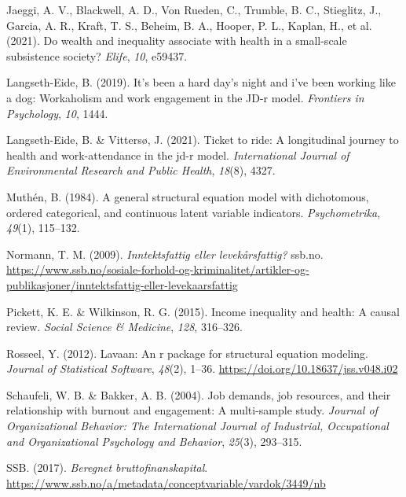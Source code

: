 \documentclass[
  12pt,
  a4paper,
  DIV=11,
  numbers=noendperiod]{scrartcl}
\newlength{\cslhangindent}
\newenvironment{CSLReferences}[2] %
 {\begin{list}{}{%
  \setlength{\itemindent}{0pt}
  \setlength{\leftmargin}{0pt}
  \setlength{\parsep}{0pt}
  \ifodd #1
   \setlength{\leftmargin}{\cslhangindent}
   \setlength{\itemindent}{-1\cslhangindent}
  \fi
  \setlength{\itemsep}{#2\baselineskip}}}
 {\end{list}}
\begin{document}
\begin{CSLReferences}{1}{0}
Jaeggi, A. V., Blackwell, A. D., Von Rueden, C., Trumble, B. C.,
Stieglitz, J., Garcia, A. R., Kraft, T. S., Beheim, B. A., Hooper, P.
L., Kaplan, H., et al. (2021). Do wealth and inequality associate with
health in a small-scale subsistence society? \emph{Elife}, \emph{10},
e59437.

Langseth-Eide, B. (2019). It's been a hard day's night and i've been
working like a dog: Workaholism and work engagement in the JD-r model.
\emph{Frontiers in Psychology}, \emph{10}, 1444.

Langseth-Eide, B. \& Vittersø, J. (2021). Ticket to ride: A longitudinal
journey to health and work-attendance in the jd-r model.
\emph{International Journal of Environmental Research and Public
Health}, \emph{18}(8), 4327.

Muthén, B. (1984). A general structural equation model with dichotomous,
ordered categorical, and continuous latent variable indicators.
\emph{Psychometrika}, \emph{49}(1), 115--132.

Normann, T. M. (2009). \emph{Inntektsfattig eller levekårsfattig?}
ssb.no.
\url{https://www.ssb.no/sosiale-forhold-og-kriminalitet/artikler-og-publikasjoner/inntektsfattig-eller-levekaarsfattig}

Pickett, K. E. \& Wilkinson, R. G. (2015). Income inequality and health:
A causal review. \emph{Social Science \& Medicine}, \emph{128},
316--326.

Rosseel, Y. (2012). Lavaan: An r package for structural equation
modeling. \emph{Journal of Statistical Software}, \emph{48}(2), 1--36.
\url{https://doi.org/10.18637/jss.v048.i02}

Schaufeli, W. B. \& Bakker, A. B. (2004). Job demands, job resources,
and their relationship with burnout and engagement: A multi-sample
study. \emph{Journal of Organizational Behavior: The International
Journal of Industrial, Occupational and Organizational Psychology and
Behavior}, \emph{25}(3), 293--315.

SSB. (2017). \emph{Beregnet bruttofinanskapital}.
\url{https://www.ssb.no/a/metadata/conceptvariable/vardok/3449/nb}


\end{CSLReferences}
\end{document}
